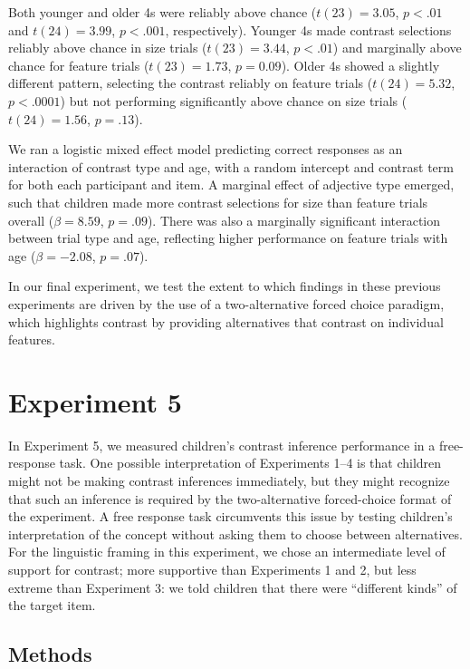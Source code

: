 \documentclass[man]{apa2}
\begin{document}
Both younger and older 4s were reliably above chance ($t(23) = 3.05$, $p<.01$ and $t(24) = 3.99$, $p<.001$, respectively). Younger 4s made contrast selections reliably above chance in size trials ($t(23)=3.44$, $p<.01$) and marginally above chance for feature trials ($t(23)=1.73$, $p=0.09$). Older 4s showed a slightly different pattern, selecting the contrast reliably on feature trials ($t(24)=5.32$, $p<.0001$) but not performing significantly above chance on size trials ($t(24)=1.56$, $p=.13$). 

We ran a logistic mixed effect model predicting correct responses as an interaction of contrast type and age, with a random intercept and contrast term for both each participant and item.  A marginal effect of adjective type emerged, such that children made more contrast selections for size than feature trials overall ($\beta = 8.59$, $p = .09$). There was also a marginally significant interaction between trial type and age, reflecting higher performance on feature trials with age ($\beta = -2.08$, $p = .07$). 

In our final experiment, we test the extent to which findings in these previous experiments are driven by the use of a two-alternative forced choice paradigm, which highlights contrast by providing alternatives that contrast on individual features.

\section{Experiment 5} 

In Experiment 5, we measured children's contrast inference performance in a free-response task. One possible interpretation of Experiments 1--4 is that children might not be making contrast inferences immediately, but they might recognize that such an inference is required by the two-alternative forced-choice format of the experiment. A free response task circumvents this issue by testing children's interpretation of the concept without asking them to choose between alternatives. For the linguistic framing in this experiment, we chose an intermediate level of support for contrast; more supportive than Experiments 1 and 2, but less extreme than Experiment 3: we told children that there were ``different kinds'' of the target item.

\subsection{Methods}
\end{document}
